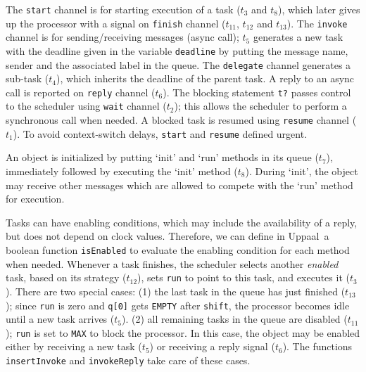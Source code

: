 \documentclass[copyright,creativecommons]{eptcs}
\theoremstyle{definition}
\renewcommand{\paragraph}[1]{\medskip \noindent {\bf #1}}
\newcommand{\Uppaal}{{\sc Uppaal}\xspace}
\begin{document}
\paragraph{Channels}
The \lstinline{start} channel is for starting execution of a task ($t_3$ and $t_8$), which later gives up the processor with a signal on \lstinline{finish} channel ($t_{11}$, $t_{12}$ and $t_{13}$). The \lstinline{invoke} channel is for sending/receiving messages (async call); $t_5$ generates a new task with the deadline given in the variable \lstinline{deadline} by putting the message name, sender and the associated label in the queue.
The \lstinline{delegate} channel generates a sub-task ($t_4$), which inherits the deadline of the parent task.
A reply to an async call is reported on \lstinline{reply} channel ($t_6$).
The blocking statement \lstinline$t?$  passes control to the scheduler using \lstinline{wait} channel ($t_2$); this allows the scheduler to perform a synchronous call when needed. A blocked task is resumed using \lstinline{resume} channel ($t_1$).
To avoid context-switch delays, \lstinline{start} and \lstinline{resume} defined urgent.


\paragraph{Start-up}
An object is initialized by putting `init' and `run' methods in its queue ($t_7$), immediately followed by executing the `init' method ($t_8$).
During `init', the object may receive other messages which are allowed to compete with the `run' method for execution.



\paragraph{Context-switch}
Tasks can have enabling conditions, which may include the availability of a reply, but does not depend on clock values. Therefore, we can define in \Uppaal\ a boolean function \lstinline$isEnabled$ to evaluate the enabling condition for each method when needed.
Whenever a task finishes, the scheduler selects another {\em enabled} task, based on its strategy ($t_{12}$), sets \lstinline$run$ to point to this task, and executes it ($t_3$).
There are two special cases: (1) the last task in the queue has just finished ($t_{13}$); since \lstinline$run$ is zero and \lstinline$q[0]$ gets \lstinline$EMPTY$ after \lstinline$shift$, the processor becomes idle until a new task arrives ($t_5$).
(2) all remaining tasks in the queue are disabled ($t_{11}$); \lstinline$run$ is set to \lstinline$MAX$ to block the processor. In this case, the object may be enabled either by receiving a new task ($t_5$) or receiving a reply signal ($t_6$). The functions \lstinline{insertInvoke} and \lstinline{invokeReply} take care of these cases.
\end{document}

